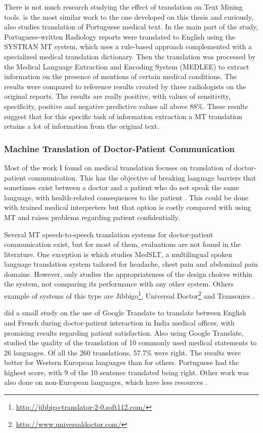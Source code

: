 There is not much research studying the effect of translation on Text Mining tools. \citep{Castilla2007a} is the most similar work to the one developed on this thesis and curiously, also studies translation of Portuguese medical text. In the main part of the study, Portuguese-written Radiology reports were translated to English using the SYSTRAN MT system, which uses a rule-based approach complemented with a specialized medical translation dictionary. Then the translation was processed by the Medical Language Extraction and Encoding System (MEDLEE) to extract information on the presence of mentions of certain medical conditions. The results were compared to reference results created by three radiologists on the original reports. The results are really positive, with values of sensitivity, specificity, positive and negative predictive values all above 88\%. These results suggest that for this specific task of information extraction a MT translation retains a lot of information from the original text.


\subsubsection{Machine Translation of Doctor-Patient Communication}

Most of the work I found on medical translation focuses on translation of doctor-patient communication. This has the objective of breaking language barriers that sometimes exist between a doctor and a patient who do not speak the same language, with health-related consequences to the patient \citep{Schyve2007}. This could be done with trained medical interpreters but that option is costly compared with using MT and raises problems regarding patient confidentially.

Several MT speech-to-speech translation systems for doctor-patient communication exist, but for most of them, evaluations are not found in the literature. One exception is \citep{Bouillon2005} which studies MedSLT, a multilingual spoken language translation system tailored for headache, chest pain and abdominal pain domains. However, \citep{Bouillon2005} only studies the appropriateness of the design choices within the system, not comparing its performance with any other system. Others example of systems of this type are Jibbigo\footnote{\url{http://jibbigo-translator-2-0.soft112.com/}}, Universal Doctor\footnote{\url{http://www.universaldoctor.com/}} and Transonics \citep{Nagata2005}.

\citep{Kaliyadan2010} did a small study on the use of Google Translate to translate between English and French during doctor-patient interaction in India medical offices, with promising results regarding patient satisfaction. Also using Google Translate, \citep{Patil2014} studied the quality of the translation of 10 commonly used medical statements to 26 languages. Of all the 260 translations, 57.7\% were right. The results were better for Western European languages than for others. Portuguese had the highest score, with 9 of the 10 sentence translated being right. Other work was also done on non-European languages, which have less resources \citep{Musleh2016, Kathol2005}.

